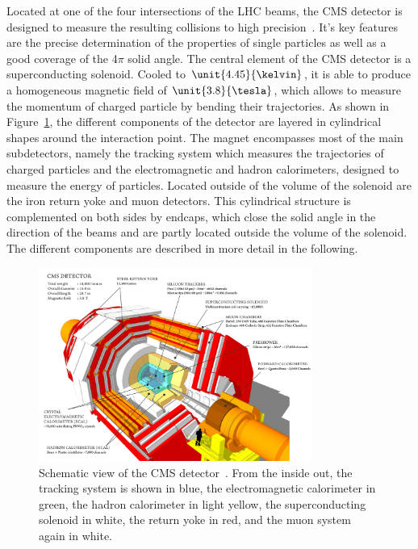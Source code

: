 Located at one of the four intersections of the LHC beams, the CMS detector is designed to measure the resulting collisions to high precision~\cite{CMS}. It's key features are the precise determination of the properties of single particles as well as a good coverage of the 4$\pi$ solid angle. The central element of the CMS detector is a superconducting solenoid. Cooled to $\unit{4.45}{\kelvin}$, it is able to produce a homogeneous magnetic field of $\unit{3.8}{\tesla}$, which allows to measure the momentum of charged particle by bending their trajectories. As shown in Figure~\ref{fig:CMS}, the different components of the detector are layered in cylindrical shapes around the interaction point. The magnet encompasses most of the main subdetectors, namely the tracking system which measures the trajectories of charged particles and the electromagnetic and hadron calorimeters, designed to measure the energy of particles. Located outside of the volume of the solenoid are the iron return yoke and muon detectors. This cylindrical structure is complemented on both sides by endcaps, which close the solid angle in the direction of the beams and are partly located outside the volume of the solenoid. The different components are described in more detail in the following. 
\begin{figure}[htbp]
\centering
  \includegraphics[width=0.8\textwidth]{plots/CMS/cms_design.png}
\caption{Schematic view of the CMS detector~\cite{CMSScetch}. From the inside out, the tracking system is shown in blue, the electromagnetic calorimeter in green, the hadron calorimeter in light yellow, the superconducting solenoid in white, the return yoke in red, and the muon system again in white.}
\label{fig:CMS}
\end{figure}
